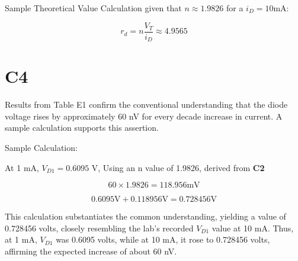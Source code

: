 	{Sample Theoretical Value Calculation given that $n \approx 1.9826$ for a $i_D = 10$mA:}

	$$r_d = n\frac{V_T}{i_D} \approx 4.9565$$

\section{{C4}}

	{Results from Table E1 confirm the conventional understanding that the diode voltage rises by approximately 60 nV for every decade increase in current. A sample calculation supports this assertion.}

	{Sample Calculation:}
	
	{At 1 mA, $V_{D1} = 0.6095$ V, Using an n value of 1.9826, derived from \textbf{{C2}}}
	
     $$60 \times 1.9826 = 118.956 \text{mV}$$
     
     $$0.6095 \text{V} + 0.118956 \text{V} = 0.728456 \text{V}$$

	{This calculation substantiates the common understanding, yielding a value of 0.728456 volts, closely resembling the lab's recorded $V_{D1}$ value at 10 mA. Thus, at 1 mA, $V_{D1}$ was 0.6095 volts, while at 10 mA, it rose to 0.728456 volts, affirming the expected increase of about 60 nV.}


